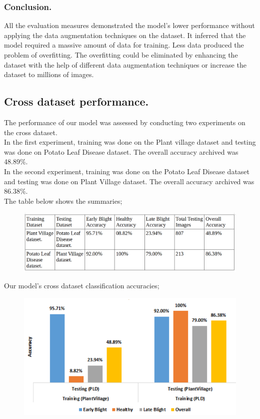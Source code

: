 \documentclass[11pt]{report}
\begin{document}
\subsubsection*{Conclusion.}
All the evaluation measures demonstrated the model’s lower performance
without applying the data augmentation techniques on the dataset. It inferred that
the model required a massive amount of data for training. Less data produced
the problem of overfitting. The overfitting could be eliminated by enhancing the dataset
with the help of different data augmentation techniques or increase the dataset to millions
of images.\\


\subsection{Cross dataset performance.}
The performance of our model was assessed by conducting two experiments on the cross dataset.\\

In the first experiment, training was done on the Plant village dataset and testing was done on Potato Leaf Disease dataset. The overall accuracy archived was 48.89\%.\\

In the second experiment, training was done on the Potato Leaf Disease dataset and testing was done on Plant Village dataset. The overall accuracy archived was 86.38\%.\\

The table below shows the summaries;
\begin{figure}[h]
	\centerline{\small 
		\includegraphics[height=0.15\textheight]  {cross}}
\end{figure}




Our model's cross dataset classification accuracies;\\
\begin{figure}[h]
	\centerline{\small 
		\includegraphics[height=0.25\textheight]  {c1}}
\end{figure}
\end{document}
